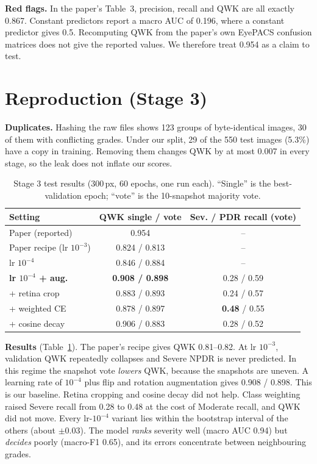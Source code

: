 \documentclass[conference]{IEEEtran}
\begin{document}
\textbf{Red flags.} In the paper's Table~3, precision, recall and QWK are all exactly 0.867. Constant predictors report
a macro AUC of 0.196, where a constant predictor gives 0.5. Recomputing QWK from the paper's own EyePACS confusion
matrices does not give the reported values. We therefore treat 0.954 as a claim to test.

\section{Reproduction (Stage 3)}
\textbf{Duplicates.} Hashing the raw files shows 123 groups of byte-identical images, 30 of them with conflicting
grades. Under our split, 29 of the 550 test images (5.3\%) have a copy in training. Removing them changes QWK by at
most 0.007 in every stage, so the leak does not inflate our scores.

\begin{table}[t]
\centering
\caption{Stage 3 test results (300\,px, 60 epochs, one run each). ``Single'' is the best-validation epoch; ``vote''
is the 10-snapshot majority vote.}
\label{tab:stage3}
\small
\setlength{\tabcolsep}{3pt}
\begin{tabular}{@{}lcc@{}}
\toprule
Setting & QWK single / vote & Sev. / PDR recall (vote) \\
\midrule
Paper (reported) & 0.954 & -- \\
Paper recipe (lr $10^{-3}$) & 0.824 / 0.813 & -- \\
lr $10^{-4}$ & 0.846 / 0.884 & -- \\
\textbf{lr $10^{-4}$ + aug.} & \textbf{0.908 / 0.898} & 0.28 / 0.59 \\
\quad + retina crop & 0.883 / 0.893 & 0.24 / 0.57 \\
\quad + weighted CE & 0.878 / 0.897 & \textbf{0.48} / 0.55 \\
\quad + cosine decay & 0.906 / 0.883 & 0.28 / 0.52 \\
\bottomrule
\end{tabular}
\end{table}

\textbf{Results} (Table~\ref{tab:stage3}). The paper's recipe gives QWK 0.81--0.82. At lr $10^{-3}$, validation QWK
repeatedly collapses and Severe NPDR is never predicted. In this regime the snapshot vote \emph{lowers} QWK, because
the snapshots are uneven. A learning rate of $10^{-4}$ plus flip and rotation augmentation gives 0.908 / 0.898. This
is our baseline. Retina cropping and cosine decay did not help. Class weighting raised Severe recall from 0.28 to 0.48
at the cost of Moderate recall, and QWK did not move. Every lr-$10^{-4}$ variant lies within the bootstrap interval of
the others (about $\pm0.03$). The model \emph{ranks} severity well (macro AUC 0.94) but \emph{decides} poorly
(macro-F1 0.65), and its errors concentrate between neighbouring grades.
\end{document}
